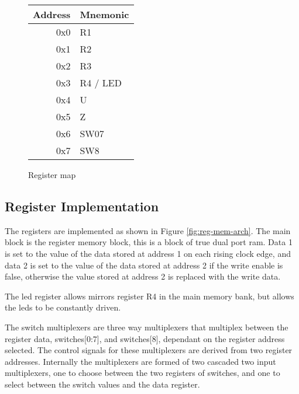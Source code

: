 \begin{figure}[ht]
	\centering
	\begin{tabular}{r | l}
		Address & Mnemonic \\
		\hline
		0x0	& R1 \\
		0x1	& R2 \\
		0x2	& R3 \\
		0x3	& R4 / LED \\
		0x4	& U \\
		0x5	& Z \\
		0x6	& SW07 \\
		0x7	& SW8 \\
	\end{tabular}
	\caption{Register map}
	\label{fig:reg-map}
\end{figure}

\subsection{Register Implementation}
The registers are implemented as shown in Figure \ref{fig:reg-mem-arch}. The main block is the register memory block, this is a block of true dual port \gls{ram}. Data 1 is set to the value of the data stored at address 1 on each rising clock edge, and data 2 is set to the value of the data stored at address 2 if the write enable is false, otherwise the value stored at address 2 is replaced with the write data.

The \gls{led} register allows mirrors register R4 in the main memory bank, but allows the \glspl{led} to be constantly driven.

The switch multiplexers are three way multiplexers that multiplex between the register data, switches[0:7], and switches[8], dependant on the register address selected. The control signals for these multiplexers are derived from two register addresses. Internally the multiplexers are formed of two cascaded two input multiplexers, one to choose between the two registers of switches, and one to select between the switch values and the data register.

